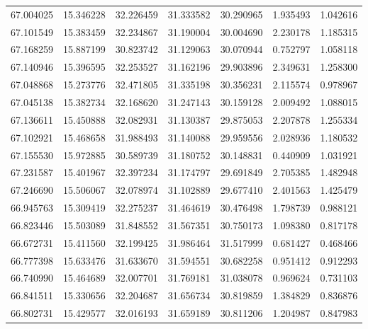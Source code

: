 \begin{tabular}{rrrrrrr}
 67.004025 &  15.346228 &         32.226459 &         31.333582 &         30.290965 &  1.935493 &  1.042616 \\
 67.101549 &  15.383459 &         32.234867 &         31.190004 &         30.004690 &  2.230178 &  1.185315 \\
 67.168259 &  15.887199 &         30.823742 &         31.129063 &         30.070944 &  0.752797 &  1.058118 \\
 67.140946 &  15.396595 &         32.253527 &         31.162196 &         29.903896 &  2.349631 &  1.258300 \\
 67.048868 &  15.273776 &         32.471805 &         31.335198 &         30.356231 &  2.115574 &  0.978967 \\
 67.045138 &  15.382734 &         32.168620 &         31.247143 &         30.159128 &  2.009492 &  1.088015 \\
 67.136611 &  15.450888 &         32.082931 &         31.130387 &         29.875053 &  2.207878 &  1.255334 \\
 67.102921 &  15.468658 &         31.988493 &         31.140088 &         29.959556 &  2.028936 &  1.180532 \\
 67.155530 &  15.972885 &         30.589739 &         31.180752 &         30.148831 &  0.440909 &  1.031921 \\
 67.231587 &  15.401967 &         32.397234 &         31.174797 &         29.691849 &  2.705385 &  1.482948 \\
 67.246690 &  15.506067 &         32.078974 &         31.102889 &         29.677410 &  2.401563 &  1.425479 \\
 66.945763 &  15.309419 &         32.275237 &         31.464619 &         30.476498 &  1.798739 &  0.988121 \\
 66.823446 &  15.503089 &         31.848552 &         31.567351 &         30.750173 &  1.098380 &  0.817178 \\
 66.672731 &  15.411560 &         32.199425 &         31.986464 &         31.517999 &  0.681427 &  0.468466 \\
 66.777398 &  15.633476 &         31.633670 &         31.594551 &         30.682258 &  0.951412 &  0.912293 \\
 66.740990 &  15.464689 &         32.007701 &         31.769181 &         31.038078 &  0.969624 &  0.731103 \\
 66.841511 &  15.330656 &         32.204687 &         31.656734 &         30.819859 &  1.384829 &  0.836876 \\
 66.802731 &  15.429577 &         32.016193 &         31.659189 &         30.811206 &  1.204987 &  0.847983 \\

\end{tabular}
